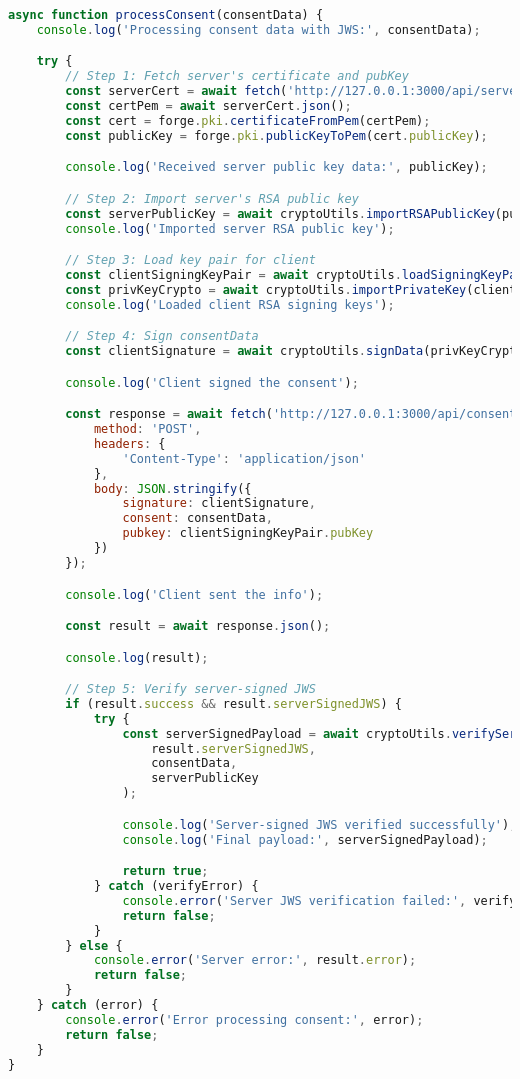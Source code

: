 \begin{lstlisting}[language=Javascript]
async function processConsent(consentData) {
	console.log('Processing consent data with JWS:', consentData);

	try {
		// Step 1: Fetch server's certificate and pubKey
		const serverCert = await fetch('http://127.0.0.1:3000/api/server_certificate');
		const certPem = await serverCert.json();
		const cert = forge.pki.certificateFromPem(certPem);
		const publicKey = forge.pki.publicKeyToPem(cert.publicKey);

		console.log('Received server public key data:', publicKey);

		// Step 2: Import server's RSA public key
		const serverPublicKey = await cryptoUtils.importRSAPublicKey(publicKey);
		console.log('Imported server RSA public key');

		// Step 3: Load key pair for client
		const clientSigningKeyPair = await cryptoUtils.loadSigningKeyPair();
		const privKeyCrypto = await cryptoUtils.importPrivateKey(clientSigningKeyPair.privKey);
		console.log('Loaded client RSA signing keys');

		// Step 4: Sign consentData
		const clientSignature = await cryptoUtils.signData(privKeyCrypto, consentData);

		console.log('Client signed the consent');

		const response = await fetch('http://127.0.0.1:3000/api/consent', {
			method: 'POST',
			headers: {
				'Content-Type': 'application/json'
			},
			body: JSON.stringify({
				signature: clientSignature,
				consent: consentData,
				pubkey: clientSigningKeyPair.pubKey
			})
		});

		console.log('Client sent the info');

		const result = await response.json();

		console.log(result);

		// Step 5: Verify server-signed JWS
		if (result.success && result.serverSignedJWS) {
			try {
				const serverSignedPayload = await cryptoUtils.verifyServerJWS(
					result.serverSignedJWS,
					consentData,
					serverPublicKey
				);

				console.log('Server-signed JWS verified successfully');
				console.log('Final payload:', serverSignedPayload);

				return true;
			} catch (verifyError) {
				console.error('Server JWS verification failed:', verifyError);
				return false;
			}
		} else {
			console.error('Server error:', result.error);
			return false;
		}
	} catch (error) {
		console.error('Error processing consent:', error);
		return false;
	}
}
\end{lstlisting}

